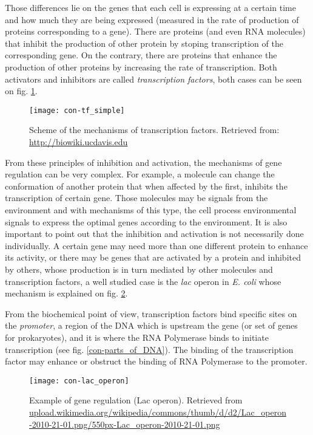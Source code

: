 Those differences lie on the genes that each cell is expressing at a certain time and how much they are being expressed (measured in the rate of production of proteins corresponding to a gene). There are proteins (and even RNA molecules) that inhibit the production of other protein by stoping transcription of the corresponding gene. On the contrary, there are proteins that enhance the production of other proteins by increasing the rate of transcription. Both activators and inhibitors are called \textit{transcription factors}, both cases can be seen on fig. \ref{fig:con-tf_simple}.

\begin{figure}[H]
  \centering
  \texttt{[image: con-tf\_simple]}
  \caption[Transcription factors]{\label{fig:con-tf_simple} Scheme of the mechanisms of transcription factors. Retrieved from: \url{http://biowiki.ucdavis.edu}}
\end{figure}

From these principles of inhibition and activation, the mechanisms of gene regulation can be very complex. For example, a molecule can change the conformation of another protein that when affected by the first, inhibits the transcription of certain gene. Those molecules may be signals from the environment and with mechanisms of this type, the cell process environmental signals to express the optimal genes according to the environment. It is also important to point out that the inhibition and activation is not necessarily done individually. A certain gene may need more than one different protein to enhance its activity, or there may be genes that are activated by a protein and inhibited by others, whose production is in turn mediated by other molecules and transcription factors, a well studied case is the \textit{lac} operon in \textit{E. coli} whose mechanism is explained on fig. \ref{fig:con-lac_operon}.

From the biochemical point of view, transcription factors bind specific sites on the \textit{promoter}, a region of the DNA which is upstream the gene (or set of genes for prokaryotes), and it is where the RNA Polymerase binds to initiate transcription (see fig. \ref{con-parts_of_DNA}). The binding of the transcription factor may enhance or obstruct the binding of RNA Polymerase to the promoter.

\begin{figure}[H]
  \centering
  \texttt{[image: con-lac\_operon]}
  \caption[Example of gene regulation]{\label{fig:con-lac_operon} Example of gene regulation (Lac operon). Retrieved from \url{upload.wikimedia.org/wikipedia/commons/thumb/d/d2/Lac_operon-2010-21-01.png/550px-Lac_operon-2010-21-01.png}}
\end{figure}

